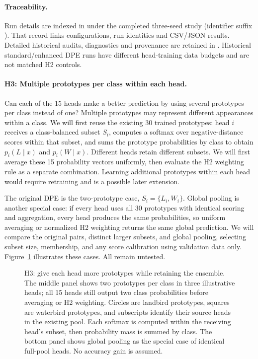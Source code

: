 \documentclass[runningheads]{llncs}
\begin{document}
\paragraph{Traceability.}
Run details are indexed in  under the completed three-seed study (identifier suffix ). That record links configurations, run identities and CSV/JSON results. Detailed historical audits, diagnostics and provenance are retained in . Historical standard/enhanced DPE runs have different head-training data budgets and are not matched H2 controls.

\paragraph{H3: Multiple prototypes per class within each head.} Can each of the 15 heads make a better prediction by using several prototypes per class instead of one? Multiple prototypes may represent different appearances within a class. We will first reuse the existing 30 trained prototypes: head $i$ receives a class-balanced subset $S_i$, computes a softmax over negative-distance scores within that subset, and sums the prototype probabilities by class to obtain $p_i(L\mid x)$ and $p_i(W\mid x)$. Different heads retain different subsets. We will first average these 15 probability vectors uniformly, then evaluate the H2 weighting rule as a separate combination. Learning additional prototypes within each head would require retraining and is a possible later extension.

The original DPE is the two-prototype case, $S_i=\{L_i,W_i\}$. Global pooling is another special case: if every head uses all 30 prototypes with identical scoring and aggregation, every head produces the same probabilities, so uniform averaging or normalized H2 weighting returns the same global prediction. We will compare the original pairs, distinct larger subsets, and global pooling, selecting subset size, membership, and any score calibration using validation data only. Figure~\ref{fig:dpe-h3} illustrates these cases. All remain untested.

\begin{figure}[H]
\centering

\caption{H3: give each head more prototypes while retaining the ensemble. The middle panel shows two prototypes per class in three illustrative heads; all 15 heads still output two class probabilities before averaging or H2 weighting. Circles are landbird prototypes, squares are waterbird prototypes, and subscripts identify their source heads in the existing pool. Each softmax is computed within the receiving head's subset, then probability mass is summed by class. The bottom panel shows global pooling as the special case of identical full-pool heads. No accuracy gain is assumed.}
\label{fig:dpe-h3}
\end{figure}
\end{document}
